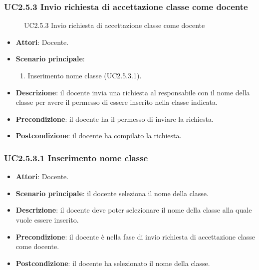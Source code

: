 \subsubsection{UC2.5.3 Invio richiesta di accettazione classe come docente}
\begin{figure}[H]
\centering
\noindent{}
\caption{UC2.5.3 Invio richiesta di accettazione classe come docente}
\end{figure}
\begin{itemize}
\item \textbf{Attori}: Docente.
\item \textbf{Scenario principale}:
\begin{enumerate}
\item Inserimento nome classe (UC2.5.3.1).
\end{enumerate}
\item \textbf{Descrizione}: il docente invia una richiesta al responsabile con il nome della classe per avere il permesso di essere inserito nella classe indicata.
\item \textbf{Precondizione}: il docente ha il permesso di inviare la richiesta.
\item \textbf{Postcondizione}: il docente ha compilato la richiesta.
\end{itemize}
\subsubsection{UC2.5.3.1 Inserimento nome classe}
\begin{itemize}
\item \textbf{Attori}: Docente.
\item \textbf{Scenario principale}: il docente seleziona il nome della classe.
\item \textbf{Descrizione}: il docente deve poter selezionare il nome della classe alla quale vuole essere inserito.
\item \textbf{Precondizione}: il docente è nella fase di invio richiesta di accettazione classe come docente.
\item \textbf{Postcondizione}: il docente ha selezionato il nome della classe.
\end{itemize}
